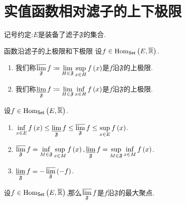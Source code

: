 \section{实值函数相对滤子的上下极限}

记号约定:$E$是装备了滤子$\mathfrak{F}$的集合.

\begin{definition}{函数沿滤子的上极限和下极限}{}
	设$f\in\operatorname{Hom}_{\mathsf{Set}}\left(E,\overline{\mathbb{R}}\right)$.
	\begin{enumerate}
		\item 我们称$\varlimsup\limits_{\mathfrak{F}}f\coloneq\displaystyle\lim_{H\in\mathfrak{F}}\sup\limits_{x\in H}f\left(x\right)$是$f$沿$\mathfrak{F}$的上极限.
		\item 我们称$\varliminf\limits_{\mathfrak{F}}f\coloneq\displaystyle\lim_{H\in\mathfrak{F}}\inf\limits_{x\in H}f\left(x\right)$是$f$沿$\mathfrak{F}$的上极限.
	\end{enumerate}
\end{definition}

\begin{proposition}{}{}
	设$f\in\operatorname{Hom}_{\mathsf{Set}}\left(E,\overline{\mathbb{R}}\right)$.
	\begin{enumerate}
		\item $\inf\limits_{x\in E}f\left(x\right)\leq\varliminf\limits_{\mathfrak{F}}f\leq\varlimsup\limits_{\mathfrak{F}}f\leq\sup\limits_{x\in E}f\left(x\right)$.
		\item $\varlimsup\limits_{\mathfrak{F}}f=\inf\limits_{M\in\mathfrak{F}}\sup\limits_{x\in M}f\left(x\right),\varliminf\limits_{\mathfrak{F}}f=\sup\limits_{M\in\mathfrak{F}}\inf\limits_{x\in M}f\left(x\right)$.
		\item $\varliminf\limits_{\mathfrak{F}}f=-\varlimsup\limits_{\mathfrak{F}}\left(-f\right)$.
	\end{enumerate}
\end{proposition}

\begin{theorem}{}{}
	设$f\in\operatorname{Hom}_{\mathsf{Set}}\left(E,\overline{\mathbb{R}}\right)$,那么$\varlimsup\limits_{\mathfrak{F}}f$是$f$沿$\mathfrak{F}$的最大聚点.
\end{theorem}

